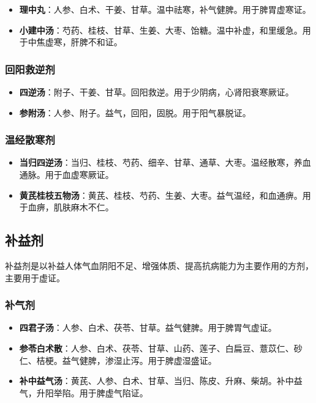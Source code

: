 \documentclass[12pt,UTF8]{ctexbook}
\begin{document}
\begin{itemize}
\item \textbf{理中丸}：人参、白术、干姜、甘草。温中祛寒，补气健脾。用于脾胃虚寒证。
\item \textbf{小建中汤}：芍药、桂枝、甘草、生姜、大枣、饴糖。温中补虚，和里缓急。用于中焦虚寒，肝脾不和证。
\end{itemize}

\subsubsection{回阳救逆剂}

\begin{itemize}
\item \textbf{四逆汤}：附子、干姜、甘草。回阳救逆。用于少阴病，心肾阳衰寒厥证。
\item \textbf{参附汤}：人参、附子。益气，回阳，固脱。用于阳气暴脱证。
\end{itemize}

\subsubsection{温经散寒剂}

\begin{itemize}
\item \textbf{当归四逆汤}：当归、桂枝、芍药、细辛、甘草、通草、大枣。温经散寒，养血通脉。用于血虚寒厥证。
\item \textbf{黄芪桂枝五物汤}：黄芪、桂枝、芍药、生姜、大枣。益气温经，和血通痹。用于血痹，肌肤麻木不仁。
\end{itemize}

\subsection{补益剂}

补益剂是以补益人体气血阴阳不足、增强体质、提高抗病能力为主要作用的方剂，主要用于虚证。

\subsubsection{补气剂}

\begin{itemize}
\item \textbf{四君子汤}：人参、白术、茯苓、甘草。益气健脾。用于脾胃气虚证。
\item \textbf{参苓白术散}：人参、白术、茯苓、甘草、山药、莲子、白扁豆、薏苡仁、砂仁、桔梗。益气健脾，渗湿止泻。用于脾虚湿盛证。
\item \textbf{补中益气汤}：黄芪、人参、白术、甘草、当归、陈皮、升麻、柴胡。补中益气，升阳举陷。用于脾虚气陷证。
\end{itemize}
\end{document}
